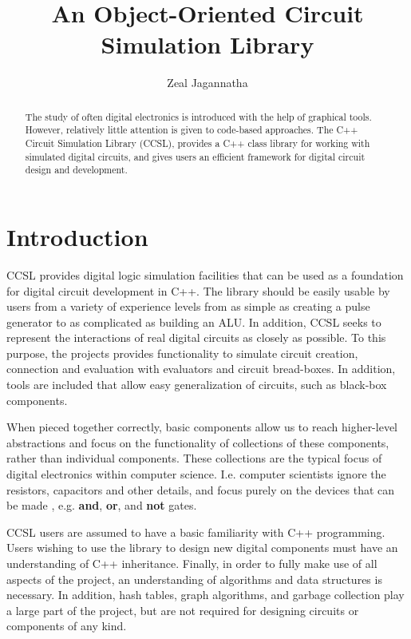 \documentclass{article}
\newcommand{\Bold}[1]{\textbf{#1}}
\begin{document}
\title{An Object-Oriented Circuit Simulation Library}
\author{Zeal Jagannatha}

\maketitle

\begin{abstract}

The study of often digital electronics is introduced with the help of graphical tools. However, relatively little attention is given to code-based approaches. The C++ Circuit Simulation Library (CCSL), provides a C++ class library for working with simulated digital circuits, and gives users an efficient framework for digital circuit design and development.

\end{abstract}

\section{Introduction}

CCSL provides digital logic simulation facilities that can be used as a foundation for digital circuit development in C++. The library should be easily usable by users from a variety of experience levels from as simple as creating a pulse generator to as complicated as building an ALU. In addition, CCSL seeks to represent the interactions of real digital circuits as closely as possible. To this purpose, the projects provides functionality to simulate circuit creation, connection and evaluation with evaluators and circuit bread-boxes. In addition, tools are included that allow easy generalization of circuits, such as black-box components.

When pieced together correctly, basic components allow us to reach higher-level abstractions and focus on the functionality of collections of these components, rather than individual components. These collections are the typical focus of digital electronics within computer science. I.e. computer scientists ignore the resistors, capacitors and other details, and focus purely on the devices that can be made , e.g. \Bold{and}, \Bold{or}, and \Bold{not} gates.

CCSL users are assumed to have a basic familiarity with C++ programming. Users wishing to use the library to design new digital components must have an understanding of C++ inheritance\cite{bjarne}. Finally, in order to fully make use of all aspects of the project, an understanding of algorithms and data structures is necessary. In addition, hash tables, graph algorithms, and garbage collection play a large part of the project, but are not required for designing circuits or components of any kind.
\end{document}
